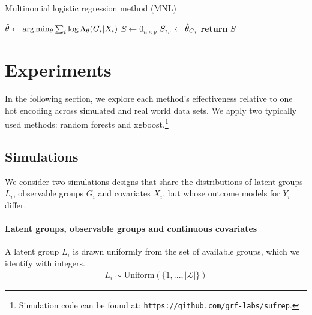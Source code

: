 \documentclass{article}
\theoremstyle{plain}
\theoremstyle{definition}
\theoremstyle{remark}
\begin{document}
\begin{algorithm}
\caption{Multinomial logistic regression method (MNL)} \label{alg:mnl}
\begin{algorithmic}[1]

\State $\hat{\theta} \gets \arg\min_{\theta} \sum_{i} \log \Lambda_{\theta}(G_{i}|X_{i})$
\State $S \gets 0_{n \times p}$
  \State $S_{i,\cdot} \gets \hat{\theta}_{G_{i}}$
\EndFor
\State \textbf{return} $S$
\EndProcedure
\end{algorithmic}
\end{algorithm}





\section{Experiments}

In the following section, we explore each method's effectiveness relative to one hot encoding across simulated and real world data sets. We apply two typically used methods: random forests and xgboost.\footnote{Simulation code can be found at: \texttt{https://github.com/grf-labs/sufrep}.}

\subsection{Simulations}
\label{sec:simulations}

We consider two simulations designs that share the distributions of latent groups $L_{i}$, observable groups $G_{i}$ and covariates $X_{i}$, but whose outcome models for $Y_{i}$ differ.

\paragraph{Latent groups, observable groups and continuous covariates} A latent group $L_{i}$ is drawn uniformly from the set of available groups, which we identify with integers.
\begin{align}
    L_{i} \sim \text{Uniform}(\{1,...,|\mathcal{L}|\})
    \label{eq:latent_groups}
\end{align}
\end{document}
